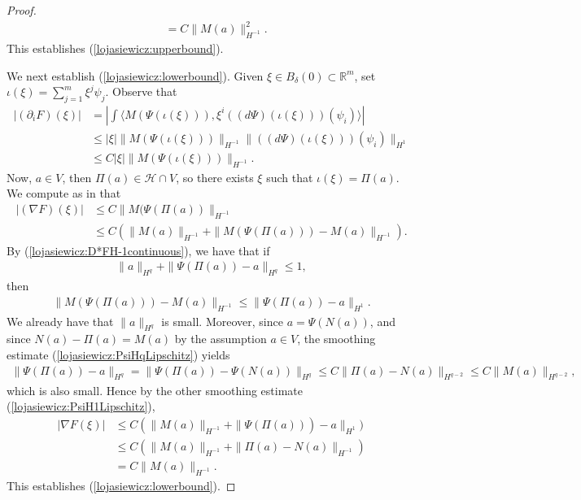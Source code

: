 \documentclass[12pt]{amsart}
\renewcommand{\1}{{\mathbf 1}}
\newcommand{\R}{{\mathbb R}}
\theoremstyle{others}
\numberwithin{equation}{section}
\begin{document}
\begin{proof}
\begin{align*}
        &= C\|M(a)\|_{H^{-1}}^2.
    \end{align*} This establishes (\ref{lojasiewicz:upperbound}). \par 
    We next establish (\ref{lojasiewicz:lowerbound}). Given \(\xi \in B_\delta(0) \subset \R^m\), set \(\iota(\xi) = \sum_{j = 1}^m \xi^j \psi_j\). Observe that
    \begin{align*}
        |(\partial_i F)(\xi)| &= \left|\int \langle M(\Psi(\iota(\xi))), \xi^i((d\Psi)(\iota(\xi)))(\psi_i)\rangle\right| \\
        &\leq |\xi|\|M(\Psi(\iota(\xi)))\|_{H^{-1}} \|((d\Psi)(\iota(\xi)))(\psi_i)\|_{H^1} \\
        &\leq C|\xi|\|M(\Psi(\iota(\xi)))\|_{H^{-1}}.
    \end{align*} Now, \(a \in V\), then \(\Pi(a) \in \mathcal{H} \cap V\), so there exists \(\xi\) such that \(\iota(\xi) = \Pi(a)\). We compute as in \cite[(2.20)]{leonsimon} that
    \begin{align*}
        |(\nabla F)(\xi)| &\leq C\|M(\Psi(\Pi(a))\|_{H^{-1}} \\
        &\leq C(\|M(a)\|_{H^{-1}}  + \|M(\Psi(\Pi(a))) - M(a)\|_{H^{-1}}).
    \end{align*} By (\ref{lojasiewicz:D*FH-1continuous}), we have that if 
    \begin{align*}
        \|a\|_{H^q} + \|\Psi(\Pi(a)) - a\|_{H^q} \leq 1,
    \end{align*} then
    \begin{align*}
        \|M(\Psi(\Pi(a))) - M(a)\|_{H^{-1}} \leq \|\Psi(\Pi(a)) - a\|_{H^1}.
    \end{align*} We already have that \(\|a\|_{H^q}\) is small. Moreover, since \(a = \Psi(N(a))\), and since \(N(a) - \Pi(a) = M(a)\) by the assumption \(a \in V\), the smoothing estimate (\ref{lojasiewicz:PsiHqLipschitz}) yields
    \begin{align*}
        \|\Psi(\Pi(a)) - a\|_{H^q} = \|\Psi(\Pi(a)) - \Psi(N(a))\|_{H^q} \leq C\|\Pi(a) - N(a)\|_{H^{q-2}} \leq C\|M(a)\|_{H^{q-2}},
    \end{align*} which is also small. Hence by the other smoothing estimate (\ref{lojasiewicz:PsiH1Lipschitz}),
    \begin{align*}
        |\nabla F(\xi)| &\leq C(\|M(a)\|_{H^{-1}}  + \|\Psi(\Pi(a))) - a\|_{H^1}) \\
        &\leq C(\|M(a)\|_{H^{-1}} + \|\Pi(a) - N(a)\|_{H^{-1}}) \\
        &= C\|M(a)\|_{H^{-1}}.
    \end{align*}This establishes (\ref{lojasiewicz:lowerbound}). \par

\end{proof}
\end{document}
